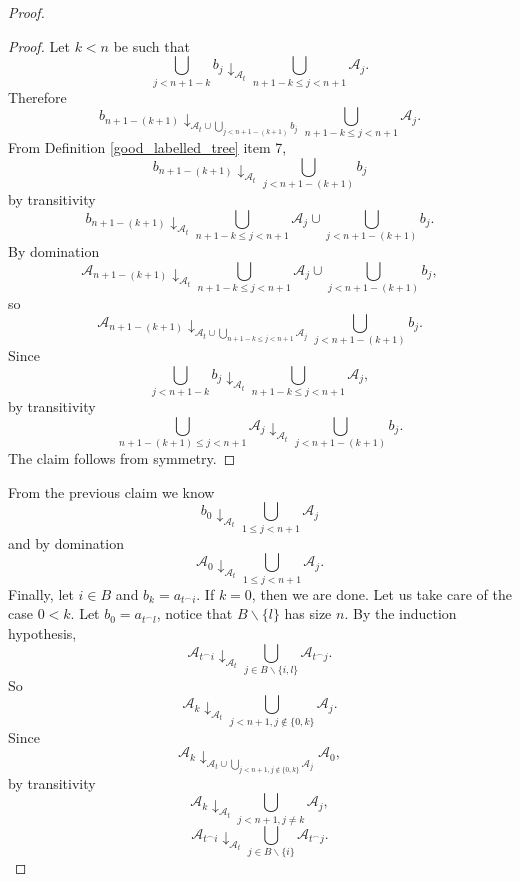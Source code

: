 \documentclass[10pt,a4paper]{amsart}
\begin{document}
\begin{proof}
\begin{proof}
        Let $k<n$ be such that $$\bigcup_{j<n+1-k}b_j\downarrow_{\mathcal{A}_t}\bigcup_{n+1-k\leq j<n+1}\mathcal{A}_j.$$ Therefore $$b_{n+1-(k+1)}\downarrow_{\mathcal{A}_t\cup \bigcup_{j<n+1-(k+1)}b_j}\bigcup_{n+1-k\leq j<n+1}\mathcal{A}_j.$$ From Definition \ref{good_labelled_tree} item 7, $$b_{n+1-(k+1)}\downarrow_{\mathcal{A}_t} \bigcup_{j<n+1-(k+1)}b_j$$ by transitivity $$b_{n+1-(k+1)}\downarrow_{\mathcal{A}_t}\bigcup_{n+1-k\leq j<n+1}\mathcal{A}_j\cup \bigcup_{j<n+1-(k+1)}b_j.$$ By domination $$\mathcal{A}_{n+1-(k+1)}\downarrow_{\mathcal{A}_t}\bigcup_{n+1-k\leq j<n+1}\mathcal{A}_j\cup \bigcup_{j<n+1-(k+1)}b_j,$$ so $$\mathcal{A}_{n+1-(k+1)}\downarrow_{\mathcal{A}_t\cup \bigcup_{n+1-k\leq j<n+1}\mathcal{A}_j} \bigcup_{j<n+1-(k+1)}b_j.$$ Since $$\bigcup_{j<n+1-k}b_j\downarrow_{\mathcal{A}_t}\bigcup_{n+1-k\leq j<n+1}\mathcal{A}_j,$$ by transitivity $$\bigcup_{n+1-(k+1)\leq j<n+1}\mathcal{A}_j\downarrow_{\mathcal{A}_t} \bigcup_{j<n+1-(k+1)}b_j.$$ The claim follows from symmetry.
    \end{proof}
    From the previous claim we know $$b_0\downarrow_{\mathcal{A}_t}\bigcup_{1\leq j<n+1}\mathcal{A}_j$$ and by domination $$\mathcal{A}_0\downarrow_{\mathcal{A}_t}\bigcup_{1\leq j<n+1}\mathcal{A}_j.$$ Finally, let $i\in B$ and $b_k=a_{t^\frown i}$. If $k=0$, then we are done. Let us take care of the case $0<k$. Let $b_0=a_{t^\frown l}$, notice that $B\backslash \{l\}$ has size $n$. By the induction hypothesis, $$\mathcal{A}_{t^\frown i}\downarrow_{\mathcal{A}_t} \bigcup_{j\in B\backslash \{i,l\}}\mathcal{A}_{t^\frown j}.$$ So $$\mathcal{A}_{k}\downarrow_{\mathcal{A}_t} \bigcup_{j<n+1, j\notin \{0,k\}}\mathcal{A}_{j}.$$ Since $$\mathcal{A}_{k}\downarrow_{\mathcal{A}_t\cup \bigcup_{j<n+1, j\notin \{0,k\}}\mathcal{A}_{j}}\mathcal{A}_0,$$ by transitivity $$\mathcal{A}_{k}\downarrow_{\mathcal{A}_t} \bigcup_{j<n+1, j\neq k}\mathcal{A}_{j},$$ $$\mathcal{A}_{t^\frown i}\downarrow_{\mathcal{A}_t} \bigcup_{j\in B\backslash \{i\}}\mathcal{A}_{t^\frown j}.$$
\end{proof}
\end{document}
